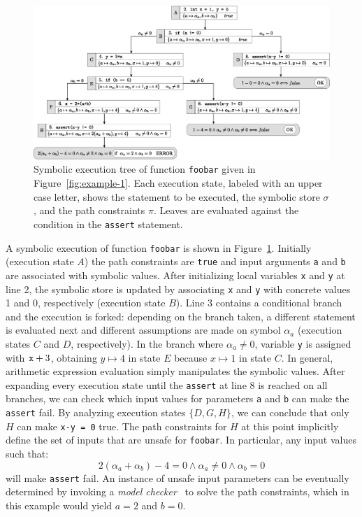 \begin{figure}[t]
  \centering
  \includegraphics[width=1.0\columnwidth]{images/execution-tree.eps} 
  \caption{Symbolic execution tree of function {\tt foobar} given in Figure~\ref{fig:example-1}. Each execution state, labeled with an upper case letter, shows the statement to be executed, the symbolic store $\sigma$, and the path constraints $\pi$. Leaves are evaluated against the condition in the {\tt assert} statement. }
  \label{fig:example-symbolic-execution}
\end{figure}

\noindent A symbolic execution of function {\tt foobar} is shown in Figure~\ref{fig:example-symbolic-execution}. Initially (execution state $A$) the path constraints are {\tt true} and input arguments {\tt a} and {\tt b} are associated with symbolic values. 
After initializing local variables {\tt x} and {\tt y} at line 2, the symbolic store is updated by associating {\tt x} and {\tt y} with concrete values 1 and 0, respectively (execution state $B$). Line 3 contains a conditional branch and the execution is forked: depending on the branch taken, a different statement is evaluated next and different assumptions are made on symbol $\alpha_a$ (execution states $C$ and $D$, respectively). In the branch where $\alpha_a\neq 0$, variable {\tt y} is assigned with ${\tt x}+3$, obtaining $y\mapsto 4$ in state $E$ because $x\mapsto 1$ in state $C$. In general, arithmetic expression evaluation simply manipulates the symbolic values.
After expanding every execution state until the {\tt assert} at line 8 is reached on all branches, we can check which input values for parameters {\tt a} and {\tt b} can make the {\tt assert} fail. By analyzing execution states $\{D,G,H\}$, we can conclude that only $H$ can make {\tt x-y = 0} true. The path constraints for $H$ at this point implicitly define the set of inputs that are unsafe for {\tt foobar}. 
In particular, any input values such that:
 \[ 2(\alpha_a+\alpha_b)-4 = 0 \wedge \alpha_a \neq 0 \wedge \alpha_b = 0 \]
will make {\tt assert} fail. An instance of unsafe input parameters can be eventually determined by invoking a {\em model checker}~\cite{} to solve the path constraints, which in this example would yield $a = 2$ and $b = 0$. 

